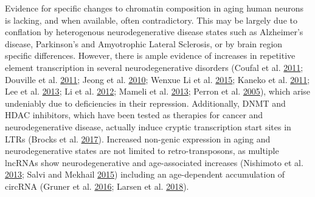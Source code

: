 \documentclass[onehalf,12pt]{beavtex}
\begin{document}
  Evidence for specific changes to chromatin composition in aging human
  neurons is lacking, and when available, often contradictory. This may be
  largely due to conflation by heterogenous neurodegenerative disease
  states such as Alzheimer's disease, Parkinson's and Amyotrophic Lateral
  Sclerosis, or by brain region specific differences. However, there is
  ample evidence of increases in repetitive element transcription in
  several neurodegenerative disorders (Coufal et al.
  \protect\hyperlink{ref-CoufalAtaxiatelangiectasiamutated2011}{2011};
  Douville et al.
  \protect\hyperlink{ref-DouvilleIdentificationactiveloci2011}{2011};
  Jeong et al.
  \protect\hyperlink{ref-Jeongprevalencehumanendogenous2010}{2010}; Wenxue
  Li et al.
  \protect\hyperlink{ref-LiHumanendogenousretrovirusK2015a}{2015}; Kaneko
  et al. \protect\hyperlink{ref-KanekoDICER1deficitinduces2011}{2011}; Lee
  et al.
  \protect\hyperlink{ref-LeeInvolvementEndogenousRetroviruses2013}{2013};
  Li et al.
  \protect\hyperlink{ref-LiTransposableelementsTDP43mediated2012}{2012};
  Mameli et al.
  \protect\hyperlink{ref-MameliActivationMSRVTypeEndogenous2013a}{2013};
  Perron et al.
  \protect\hyperlink{ref-PerronHumanendogenousretrovirus2005}{2005}),
  which arise undeniably due to deficiencies in their repression.
  Additionally, DNMT and HDAC inhibitors, which have been tested as
  therapies for cancer and neurodegenerative disease, actually induce
  cryptic transcription start sites in LTRs (Brocks et al.
  \protect\hyperlink{ref-BrocksDNMTHDACinhibitors2017}{2017}). Increased
  non-genic expression in aging and neurodegenerative states are not
  limited to retro-transposons, as multiple lncRNAs show neurodegenerative
  and age-associated increases (Nishimoto et al.
  \protect\hyperlink{ref-NishimotolongnoncodingRNA2013}{2013}; Salvi and
  Mekhail \protect\hyperlink{ref-SalviRloopshighlightnucleus2015}{2015})
  including an age-dependent accumulation of circRNA (Gruner et al.
  \protect\hyperlink{ref-GrunerCircRNAaccumulationaging2016}{2016}; Larsen
  et al. \protect\hyperlink{ref-LarsenWarningSINEsAlu2018b}{2018}).
  
\end{document}
